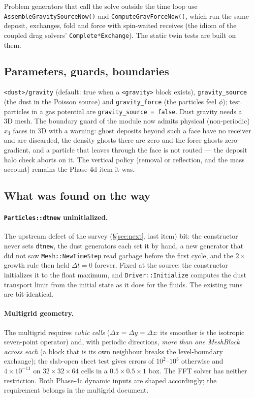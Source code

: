 \documentclass[11pt]{article}
\newcommand{\code}[1]{\texttt{#1}}
\newcommand{\fn}[1]{\texttt{\small #1}}
\begin{document}
Problem generators that call the solve outside the time loop use
\fn{AssembleGravitySourceNow()} and \fn{ComputeGravForceNow()}, which run the same
deposit, exchanges, fold and force with spin-waited receives (the idiom of the coupled
drag solvers' \fn{Complete*Exchange}). The static twin tests are built on them.

\subsection{Parameters, guards, boundaries}

\code{<dust>/gravity} (default: true when a \code{<gravity>} block exists),
\code{gravity\_source} (the dust in the Poisson source) and \code{gravity\_force} (the
particles feel $\phi$); test particles in a gas potential are
\code{gravity\_source = false}. Dust gravity needs a 3D mesh. The boundary guard of the
module now admits physical (non-periodic) $x_3$ faces in 3D with a warning: ghost
deposits beyond such a face have no receiver and are discarded, the density ghosts
there are zero and the force ghosts zero-gradient, and a particle that leaves through
the face is not routed --- the deposit halo check aborts on it. The vertical policy
(removal or reflection, and the mass account) remains the Phase-4d item it was.

\subsection{What was found on the way}

\paragraph{\code{Particles::dtnew} uninitialized.} The upstream defect of the survey
(\S\ref{sec:next}, last item) bit: the constructor never sets \code{dtnew}, the dust
generators each set it by hand, a new generator that did not saw \fn{Mesh::NewTimeStep}
read garbage before the first cycle, and the $2\times$ growth rule then held
$\Delta t = 0$ forever. Fixed at the source: the constructor initializes it to the
float maximum, and \fn{Driver::Initialize} computes the dust transport limit from the
initial state as it does for the fluids. The existing runs are bit-identical.

\paragraph{Multigrid geometry.} The multigrid requires \emph{cubic cells}
($\Delta x = \Delta y = \Delta z$: its smoother is the isotropic seven-point operator)
and, with periodic directions, \emph{more than one MeshBlock across each} (a block that
is its own neighbour breaks the level-boundary exchange); the slab-open sheet test
gives errors of $10^{2}$--$10^{3}$ otherwise and $4\times10^{-11}$ on $32\times32\times64$
cells in a $0.5\times0.5\times1$ box. The FFT solver has neither restriction. Both
Phase-4c dynamic inputs are shaped accordingly; the requirement belongs in the
multigrid document.
\end{document}
